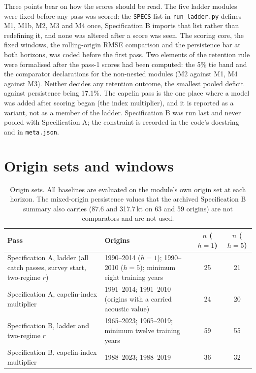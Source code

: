 Three points bear on how the scores should be read. The five ladder modules were fixed before any pass was scored: the \texttt{SPECS} list in \texttt{run\_ladder.py} defines M1, M1b, M2, M3 and M4 once, Specification B imports that list rather than redefining it, and none was altered after a score was seen. The scoring core, the fixed windows, the rolling-origin RMSE comparison and the persistence bar at both horizons, was coded before the first pass. Two elements of the retention rule were formalised after the pass-1 scores had been computed: the 5\% tie band and the comparator declarations for the non-nested modules (M2 against M1, M4 against M3). Neither decides any retention outcome, the smallest pooled deficit against persistence being 17.1\%. The capelin pass is the one place where a model was added after scoring began (the index multiplier), and it is reported as a variant, not as a member of the ladder. Specification B was run last and never pooled with Specification A; the constraint is recorded in the code's docstring and in \texttt{meta.json}.

\section{Origin sets and windows}\label{si:origins}

\begin{table}[!htb]
\centering\small
\caption{Origin sets. All baselines are evaluated on the module's own origin set at each horizon. The mixed-origin persistence values that the archived Specification B summary also carries (87.6 and 317.7\,kt on 63 and 59 origins) are not comparators and are not used.}
\begin{tabularx}{\textwidth}{@{}>{\raggedright\arraybackslash}p{}Lcc@{}}
\toprule
Pass & Origins & $n$ ($h=1$) & $n$ ($h=5$) \\
\midrule
Specification A, ladder (all catch passes, survey start, two-regime $r$) & 1990--2014 ($h=1$); 1990--2010 ($h=5$); minimum eight training years & 25 & 21 \\
Specification A, capelin-index multiplier & 1991--2014; 1991--2010 (origins with a carried acoustic value) & 24 & 20 \\
Specification B, ladder and two-regime $r$ & 1965--2023; 1965--2019; minimum twelve training years & 59 & 55 \\
Specification B, capelin-index multiplier & 1988--2023; 1988--2019 & 36 & 32 \\
\bottomrule
\end{tabularx}
\end{table}

